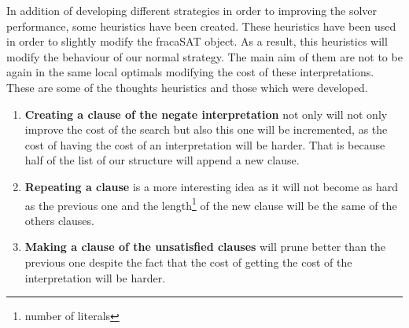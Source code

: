 
In addition of developing different strategies in order to improving the solver performance, some heuristics have been created.
These heuristics have been used in order to slightly modify the fracaSAT object. As a result, this heuristics will modify the behaviour of our normal strategy. The main aim of them are not to be again in the same local optimals modifying the cost of these interpretations. These are some of the thoughts heuristics and those which were developed.
\begin{enumerate}
\item \textbf{Creating a clause of the negate interpretation} not only will not only improve the cost of the search but also this one will be incremented, as the cost of having the cost of an interpretation will be harder. That is because half of the list of our structure will append a new clause.
\item \textbf{Repeating a clause} is a more interesting idea as it will not become as hard as the previous one and the length\footnote{number of literals} of the new clause will be the same of the others clauses.
\item \textbf{Making a clause of the unsatisfied clauses} will prune better than the previous one despite the fact that the cost of getting the cost of the interpretation will be harder.
\end{enumerate}
